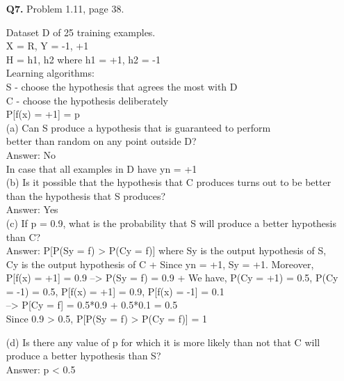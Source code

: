 \documentclass[12pt]{article}
\begin{document}
\begin{enumerate}
\item [\textbf{Q7.}] Problem 1.11, page 38.
	\begin{addmargin}[1em]{2em}%
		Dataset D of 25 training examples.\\
		X = R, Y = {-1, +1}\\
		H = {h1, h2} where h1 = +1, h2 = -1\\
		Learning algorithms:\\
		S - choose the hypothesis that agrees the most with D\\
		C - choose the hypothesis deliberately\\
		P[f(x) = +1] = p\\

		(a) Can S produce a hypothesis that is guaranteed to perform\\ better than random on any point outside D?\\
		Answer: No\\

		In case that all examples in D have yn = +1\\
		(b) Is it possible that the hypothesis that C produces turns out
		 to be better than the hypothesis that S produces?\\
		Answer: Yes\\

		(c) If p = 0.9, what is the probability that S will produce a better hypothesis than C?\\
		Answer: P[P(Sy = f) > P(Cy = f)] where Sy is the output hypothesis of S, Cy is the output hypothesis of C
+ Since yn = +1, Sy = +1. Moreover, P[f(x) = +1] = 0.9 --> P(Sy = f) = 0.9
+ We have, P(Cy = +1) = 0.5, P(Cy = -1) = 0.5, P[f(x) = +1] = 0.9, P[f(x) = -1] = 0.1\\
		--> P[Cy = f] = 0.5*0.9 + 0.5*0.1 = 0.5\\
		Since 0.9 > 0.5, P[P(Sy = f) > P(Cy = f)] = 1

		(d) Is there any value of p for which it is more likely than not that C will produce a better hypothesis than S?\\
		Answer: p < 0.5
	\end{addmargin}
\end{enumerate}
\end{document}
